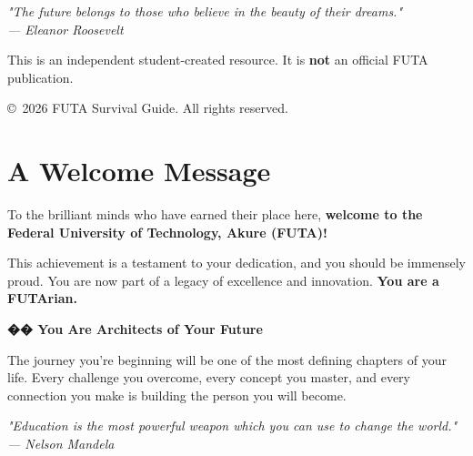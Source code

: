 \documentclass[11pt,a4paper]{article}
\newcommand{\quotetext}[1]{\begin{quotebox}\itshape\color{primary}#1\end{quotebox}}
\newcommand{\highlight}[1]{\textbf{\textcolor{primary}{#1}}}
\begin{document}
\begin{titlepage}
    \vfill

    \begin{quotebox}
        \centering\itshape\color{primary}
        "The future belongs to those who believe in the beauty of their dreams."\\
        \textnormal{\small --- Eleanor Roosevelt}
    \end{quotebox}

    \vspace{1cm}

    {\color{textGray}\footnotesize This is an independent student-created resource. It is \textbf{not} an official FUTA publication.\par}

    \vspace{0.5cm}

    {\color{textGray}\footnotesize \copyright\ 2026 FUTA Survival Guide. All rights reserved.\par}

\end{titlepage}

\newpage
\tableofcontents

\newpage
\section*{A Welcome Message}

To the brilliant minds who have earned their place here, \textbf{welcome to the Federal University of Technology, Akure (FUTA)!}

This achievement is a testament to your dedication, and you should be immensely proud. You are now part of a legacy of excellence and innovation. \highlight{You are a FUTArian.}

\begin{inspirational}
    \textbf{\color{primary}\Large �� You Are Architects of Your Future}

    \vspace{0.5em}

    The journey you're beginning will be one of the most defining chapters of your life. Every challenge you overcome, every concept you master, and every connection you make is building the person you will become.

    \vspace{0.5em}

    \quotetext{"Education is the most powerful weapon which you can use to change the world." \\ --- Nelson Mandela}
\end{inspirational}
\end{document}
